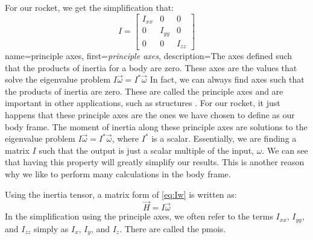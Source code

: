 \documentclass[12pt]{report}
\begin{document}
For our rocket, we get the simplification that:
$$I=\begin{bmatrix}
    I_{xx}&0&0\\
    0&I_{yy}&0\\
    0&0&I_{zz}
\end{bmatrix}$$
{
    name={principle axes},
    first=\textit{principle axes},
    description={The axes defined such that the products of inertia for a body are zero. These axes are the values that solve the eigenvalue problem $I\vec{\omega}=I^*\vec{\omega}$}
}
In fact, we can always find axes such that the products of inertia are zero. These are called the \gls{principle axes} and are important in other applications, such as structures \cite{baker_statics_2020}. For our rocket, it just happens that these \gls{principle axes} are the ones we have chosen to define as our body frame. The moment of inertia along these principle axes are solutions to the eigenvalue problem $I\vec{\omega}=I^*\vec{\omega}$, where $I^*$ is a scalar. Essentially, we are finding a matrix $I$ such that the output is just a scalar multiple of the input, $\omega$. We can see that having this property will greatly simplify our results. This is another reason why we like to perform many calculations in the body frame.

Using the inertia tensor, a matrix form of \eqref{eq:Iw}  is written as:
\begin{equation}\label{eq:IwVec}
    \vec{H}=I\vec{\omega}
\end{equation}
In the simplification using the principle axes, we often refer to the terms $I_{xx}$, $I_{yy}$, and $I_{zz}$ simply as $I_x$, $I_y$, and $I_z$. There are called the \glspl{pmoi}.
\end{document}
